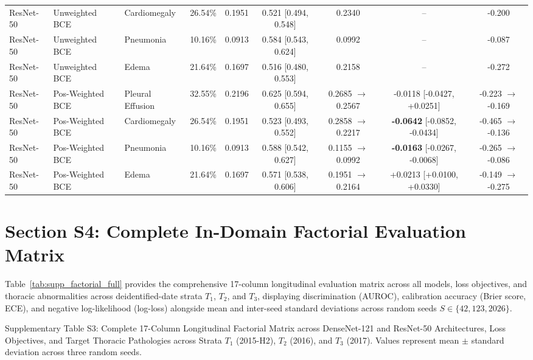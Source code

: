 \documentclass[preprint,12pt]{elsarticle}
\begin{document}
\begin{table}[!htbp]
{\begin{tabular}{lllcccccc}
ResNet-50 & Unweighted BCE & Cardiomegaly & 26.54\% & 0.1951 & 0.521 [0.494, 0.548] & 0.2340 & -- & -0.200 \\
ResNet-50 & Unweighted BCE & Pneumonia & 10.16\% & 0.0913 & 0.584 [0.543, 0.624] & 0.0992 & -- & -0.087 \\
ResNet-50 & Unweighted BCE & Edema & 21.64\% & 0.1697 & 0.516 [0.480, 0.553] & 0.2158 & -- & -0.272 \\
\midrule
ResNet-50 & Pos-Weighted BCE & Pleural Effusion & 32.55\% & 0.2196 & 0.625 [0.594, 0.655] & 0.2685 $\to$ 0.2567 & -0.0118 [-0.0427, +0.0251] & -0.223 $\to$ -0.169 \\
ResNet-50 & Pos-Weighted BCE & Cardiomegaly & 26.54\% & 0.1951 & 0.523 [0.493, 0.552] & 0.2858 $\to$ 0.2217 & \textbf{-0.0642} [-0.0852, -0.0434] & -0.465 $\to$ -0.136 \\
ResNet-50 & Pos-Weighted BCE & Pneumonia & 10.16\% & 0.0913 & 0.588 [0.542, 0.627] & 0.1155 $\to$ 0.0992 & \textbf{-0.0163} [-0.0267, -0.0068] & -0.265 $\to$ -0.086 \\
ResNet-50 & Pos-Weighted BCE & Edema & 21.64\% & 0.1697 & 0.571 [0.538, 0.606] & 0.1951 $\to$ 0.2164 & +0.0213 [+0.0100, +0.0330] & -0.149 $\to$ -0.275 \\
\bottomrule
\end{tabular}%
}
\end{table}

\section*{Section S4: Complete In-Domain Factorial Evaluation Matrix}
Table~\ref{tab:supp_factorial_full} provides the comprehensive 17-column longitudinal evaluation matrix across all models, loss objectives, and thoracic abnormalities across deidentified-date strata $T_1$, $T_2$, and $T_3$, displaying discrimination (AUROC), calibration accuracy (Brier score, ECE), and negative log-likelihood (log-loss) alongside mean and inter-seed standard deviations across random seeds $S \in \{42, 123, 2026\}$.

\begin{table}[!htbp]
\caption{Supplementary Table S3: Complete 17-Column Longitudinal Factorial Matrix across DenseNet-121 and ResNet-50 Architectures, Loss Objectives, and Target Thoracic Pathologies across Strata $T_1$ (2015-H2), $T_2$ (2016), and $T_3$ (2017). Values represent mean $\pm$ standard deviation across three random seeds.}
\label{tab:supp_factorial_full}
\centering
\resizebox{\textwidth}{!}{%

}
\end{table}
\end{document}
